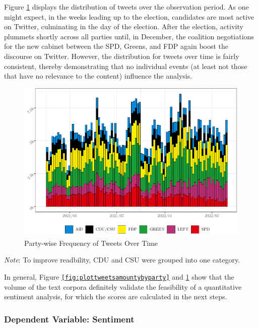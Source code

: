 \documentclass[a4paper,11pt]{article}
\begin{document}
Figure \texttt{\ref{fig:tweetshist}} displays the distribution of tweets over the observation period. As one might expect, in the weeks leading up to the election, candidates are most active on Twitter, culminating in the day of the election. After the election, activity plummets shortly across all parties until, in December, the coalition negotiations for the new cabinet between the SPD, Greens, and FDP again boost the discourse on Twitter. However, the distribution for tweets over time is fairly consistent, thereby demonstrating that no individual events (at least not those that have no relevance to the content) influence the analysis.
\begin{figure}[H]

\includegraphics[width=0.95\linewidth]{thesis_files/figure-latex/tweetshist-1} \hfill{}

\caption{Party-wise Frequency of Tweets Over Time}\label{fig:tweetshist}
\end{figure}
\vspace{-1cm}
    \begin{minipage}{\linewidth}
    \begin{center}
    \scriptsize
    \textit{Note}: To improve readbility, CDU and CSU were grouped into one category.
    \end{center}
    \end{minipage}
In general, Figure \texttt{\ref{fig:plottweetsamountybyparty}} and \texttt{\ref{fig:tweetshist}} show that the volume of the text corpora definitely validate the feasibility of a quantitative sentiment analysis, for which the scores are calculated in the next steps.

\hypertarget{dv}{%
\subsubsection{Dependent Variable: Sentiment}\label{dv}}
\end{document}
